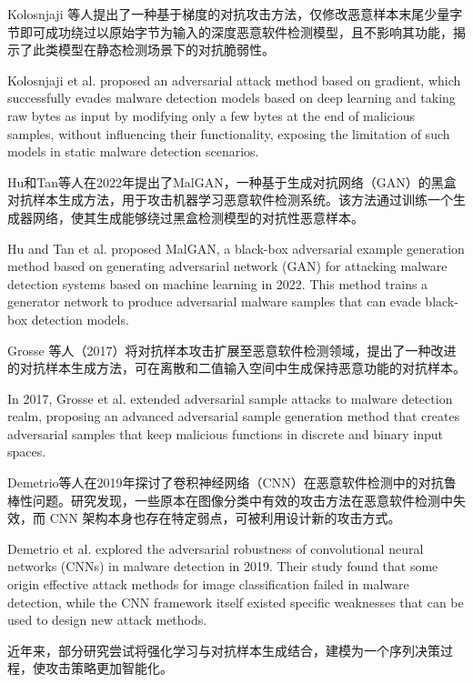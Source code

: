 Kolosnjaji 等人\cite{kolosnjaji2018adversarial}提出了一种基于梯度的对抗攻击方法，仅修改恶意样本末尾少量字节即可成功绕过以原始字节为输入的深度恶意软件检测模型，且不影响其功能，揭示了此类模型在静态检测场景下的对抗脆弱性。

Kolosnjaji et al.\cite{kolosnjaji2018adversarial} proposed an adversarial attack method based on gradient, which successfully evades malware detection models based on deep learning and taking raw bytes as input by modifying only a few bytes at the end of malicious samples, without influencing their functionality, exposing the limitation of such models in static malware detection scenarios.

Hu和Tan等人在2022年提出了MalGAN\cite{hu2022generating}，一种基于生成对抗网络（GAN）的黑盒对抗样本生成方法，用于攻击机器学习恶意软件检测系统。该方法通过训练一个生成器网络，使其生成能够绕过黑盒检测模型的对抗性恶意样本。

Hu and Tan et al. proposed MalGAN\cite{hu2022generating}, a black-box adversarial example generation method based on generating adversarial network (GAN) for attacking malware detection systems based on machine learning in 2022. This method trains a generator network to produce adversarial malware samples that can evade black-box detection models.

Grosse 等人（2017）\cite{grosse2017adversarial}将对抗样本攻击扩展至恶意软件检测领域，提出了一种改进的对抗样本生成方法，可在离散和二值输入空间中生成保持恶意功能的对抗样本。

In 2017, Grosse et al. extended adversarial sample attacks to malware detection realm\cite{grosse2017adversarial}, proposing an advanced adversarial sample generation method that creates adversarial samples that keep malicious functions in discrete and binary input spaces.

Demetrio等人在2019年探讨了卷积神经网络（CNN）在恶意软件检测中的对抗鲁棒性问题\cite{demetrio2019explaining}。研究发现，一些原本在图像分类中有效的攻击方法在恶意软件检测中失效，而 CNN 架构本身也存在特定弱点，可被利用设计新的攻击方式。

Demetrio et al. explored the adversarial robustness of convolutional neural networks (CNNs) in malware detection in 2019\cite{demetrio2019explaining}. Their study found that some origin effective attack methods for image classification failed in malware detection, while the CNN framework itself existed specific weaknesses that can be used to design new attack methods.

近年来，部分研究尝试将强化学习与对抗样本生成结合，建模为一个序列决策过程，使攻击策略更加智能化。

